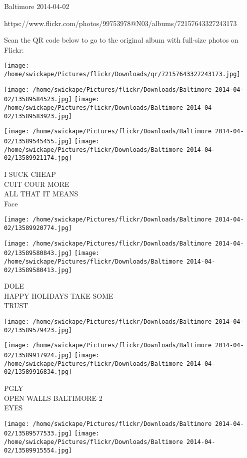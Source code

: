 \documentclass[10pt,letterpaper]{article}
\begin{document}
Baltimore 2014-04-02

https://www.flickr.com/photos/99753978@N03/albums/72157643327243173

Scan the QR code below to go to the original album with full-size photos on Flickr:

\texttt{[image: /home/swickape/Pictures/flickr/Downloads/qr/72157643327243173.jpg]}
\pagebreak

\texttt{[image: /home/swickape/Pictures/flickr/Downloads/Baltimore 2014-04-02/13589584523.jpg]}
\texttt{[image: /home/swickape/Pictures/flickr/Downloads/Baltimore 2014-04-02/13589583923.jpg]}

\texttt{[image: /home/swickape/Pictures/flickr/Downloads/Baltimore 2014-04-02/13589545455.jpg]}
\texttt{[image: /home/swickape/Pictures/flickr/Downloads/Baltimore 2014-04-02/13589921174.jpg]}

I SUCK CHEAP\\
CUIT COUR MORE\\
ALL THAT IT MEANS\\
Face
\pagebreak

\texttt{[image: /home/swickape/Pictures/flickr/Downloads/Baltimore 2014-04-02/13589920774.jpg]}

\vspace{0.25in}
\texttt{[image: /home/swickape/Pictures/flickr/Downloads/Baltimore 2014-04-02/13589580843.jpg]}
\texttt{[image: /home/swickape/Pictures/flickr/Downloads/Baltimore 2014-04-02/13589580413.jpg]}

DOLE\\
HAPPY HOLIDAYS TAKE SOME\\
TRUST
\pagebreak

\texttt{[image: /home/swickape/Pictures/flickr/Downloads/Baltimore 2014-04-02/13589579423.jpg]}

\vspace{0.25in}
\texttt{[image: /home/swickape/Pictures/flickr/Downloads/Baltimore 2014-04-02/13589917924.jpg]}
\texttt{[image: /home/swickape/Pictures/flickr/Downloads/Baltimore 2014-04-02/13589916834.jpg]}

PGLY\\
OPEN WALLS BALTIMORE 2\\
EYES
\pagebreak

\texttt{[image: /home/swickape/Pictures/flickr/Downloads/Baltimore 2014-04-02/13589577533.jpg]}
\texttt{[image: /home/swickape/Pictures/flickr/Downloads/Baltimore 2014-04-02/13589915554.jpg]}
\end{document}
